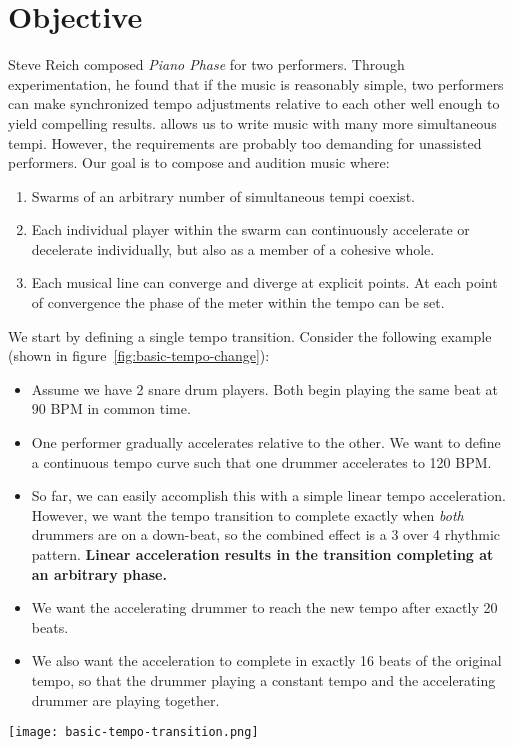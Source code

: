 \section{Objective}
\label{sec:polytempic-objective}
Steve Reich composed \textit{Piano Phase} for two performers. Through
experimentation, he found that if the music is reasonably simple, two
performers can make synchronized tempo adjustments relative to each
other well enough to yield compelling results. \polytempic allows us
to write music with many more simultaneous tempi. However, the
requirements are probably too demanding for unassisted performers. Our
goal is to compose and audition music where:
\begin{enumerate}
  \item Swarms of an arbitrary number of simultaneous tempi
    coexist. 
  \item Each individual player within the swarm can continuously
    accelerate or decelerate individually, but also as a member of a
    cohesive whole. 
  \item Each musical line can converge and diverge at explicit
    points. At each point of convergence the phase of the meter within
    the tempo can be set.
\end{enumerate}
We start by defining a single tempo transition. Consider the following
example (shown in figure~\ref{fig:basic-tempo-change}):
\begin{itemize}
\item Assume we have 2 snare drum players. Both begin playing the same
  beat at 90 BPM in common time.
\item One performer gradually accelerates relative to the other. We want
  to define a continuous tempo curve such that one drummer accelerates
  to 120 BPM.
\item So far, we can easily accomplish this with a simple linear tempo
  acceleration. However, we want the tempo transition to complete
  exactly when \emph{both} drummers are on a down-beat, so the
  combined effect is a 3 over 4 rhythmic pattern. \textbf{Linear
    acceleration results in the transition completing at an arbitrary
    phase.}
\item We want the accelerating drummer to reach the new tempo after
  exactly 20 beats.
\item We also want the acceleration to complete in exactly 16 beats of
  the original tempo, so that the drummer playing a constant tempo and the
  accelerating drummer are playing together.
\end{itemize}
\begin{figure*}[h]
  \texttt{[image: basic-tempo-transition.png]}
  \caption[Tempo Transition]{Tempo transition from 90~BPM
    to 120~BPM}
  \label{fig:basic-tempo-change}
\end{figure*}


